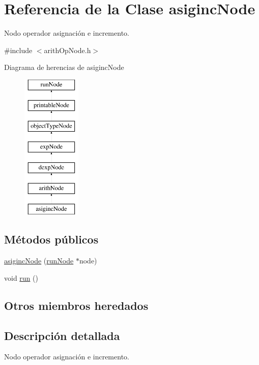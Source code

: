 \hypertarget{classasigincNode}{\section{Referencia de la Clase asiginc\-Node}
\label{classasigincNode}
}


Nodo operador asignación e incremento.  




{\ttfamily \#include $<$arith\-Op\-Node.\-h$>$}

Diagrama de herencias de asiginc\-Node\begin{figure}[H]
\begin{center}
\leavevmode
\includegraphics[height=7.000000cm]{classasigincNode}
\end{center}
\end{figure}
\subsection*{Métodos públicos}
\begin{DoxyCompactItemize}
\item 
\hyperlink{classasigincNode_a967172e05a123cff542f506b358827bb}{asiginc\-Node} (\hyperlink{classrunNode}{run\-Node} $\ast$node)
\item 
void \hyperlink{classasigincNode_abba913e2980459be1217172e294c1e22}{run} ()
\end{DoxyCompactItemize}
\subsection*{Otros miembros heredados}


\subsection{Descripción detallada}
Nodo operador asignación e incremento. 

